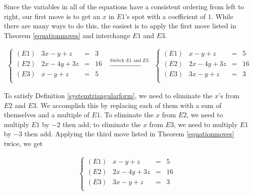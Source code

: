 \begin{ex}
\begin{enumerate}
Since the variables in all of the equations have a consistent ordering from left to right, our first move is to get an $x$ in $E1$'s spot with a coefficient of $1$.  While there are many ways to do this, the easiest is to apply the first move listed in Theorem \ref{equationmoves} and interchange $E1$ and $E3$.

\[\begin{array}{ccc}

\left\{  \begin{array}{lrcr}

(E1) & 3x-y+z & = & 3 \\
(E2)  & 2x-4y+3z & = & 16 \\
(E3)  &  x-y+z & = & 5 \\ 

\end{array} \right.

&
\xrightarrow{\text{Switch $E1$ and $E3$}}

&

\left\{ \begin{array}{lrcr}

(E1) & x-y+z & = & 5 \\
(E2) & 2x-4y+3z & = & 16 \\
(E3) & 3x-y+z & = & 3 \\

\end{array} \right.

\end{array}\]



To satisfy Definition \ref{systemtriangularform}, we need to eliminate the $x$'s from $E2$ and $E3$.  We accomplish this by replacing each of them with a sum of themselves and a multiple of $E1$.  To eliminate the $x$ from $E2$, we need to multiply $E1$ by $-2$ then add;  to eliminate the $x$ from $E3$, we need to multiply $E1$ by $-3$ then add.  Applying the third move listed in Theorem \ref{equationmoves} twice, we get

\[ \begin{array}{ccc}

\left\{ 

\begin{array}{lrcr}

(E1) & x-y+z & = & 5 \\
(E2) & 2x-4y+3z & = & 16 \\
(E3) & 3x-y+z & = & 3 \\

\end{array} 


\end{array}\]
\end{enumerate}
\end{ex}
